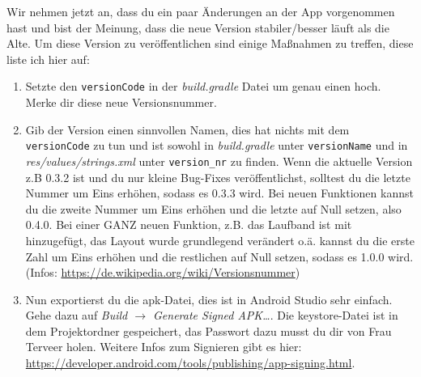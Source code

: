 \documentclass[12pt,headsepline]{scrartcl}
\begin{document}
Wir nehmen jetzt an, dass du ein paar Änderungen an der App vorgenommen hast und bist der Meinung, dass die neue Version stabiler/besser läuft als die Alte.
Um diese Version zu veröffentlichen sind einige Maßnahmen zu treffen, diese liste ich hier auf:
\begin{enumerate}
\item \label{versionscode} Setzte den \texttt{versionCode} in der \textit{build.gradle} Datei um genau einen hoch. Merke dir diese neue Versionsnummer.
\item \label{versionsname} Gib der Version einen sinnvollen Namen, dies hat nichts mit dem \texttt{versionCode} zu tun und ist sowohl in \textit{build.gradle} unter \texttt{versionName} und in \textit{res/values/strings.xml} unter \texttt{version\_nr} zu finden.
Wenn die aktuelle Version z.B 0.3.2 ist und du nur kleine Bug-Fixes veröffentlichst, solltest du die letzte Nummer um Eins erhöhen, sodass es 0.3.3 wird.
Bei neuen Funktionen kannst du die zweite Nummer um Eins erhöhen und die letzte auf Null setzen, also 0.4.0.
Bei einer GANZ neuen Funktion, z.B. das Laufband ist mit hinzugefügt, das Layout wurde grundlegend verändert o.ä. kannst du die erste Zahl um Eins erhöhen und die restlichen auf Null setzen, sodass es 1.0.0 wird.
(Infos: \url{https://de.wikipedia.org/wiki/Versionsnummer})
\item Nun exportierst du die apk-Datei, dies ist in Android Studio sehr einfach. Gehe dazu auf \textit{Build $\rightarrow$ Generate Signed APK\dots}.
Die keystore-Datei ist in dem Projektordner gespeichert, das Passwort dazu musst du dir von Frau Terveer holen.
Weitere Infos zum Signieren gibt es hier: \url{https://developer.android.com/tools/publishing/app-signing.html}.
 

\end{enumerate}
\end{document}
